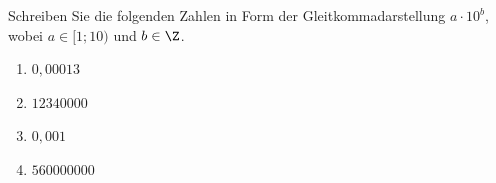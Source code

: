 \begin{ExerciseBlock}
Schreiben Sie die folgenden Zahlen in Form der Gleitkommadarstellung $a \cdot 10^b$, wobei $a \in [ 1; 10 )$ und $b \in \Z$.
\begin{enumerate}[label=\alph*)]
	\item $\displaystyle 0,00013$
	\item $\displaystyle 12340000$
	\item $\displaystyle 0,001$
	\item $\displaystyle 560000000$
\end{enumerate}

\end{ExerciseBlock}
